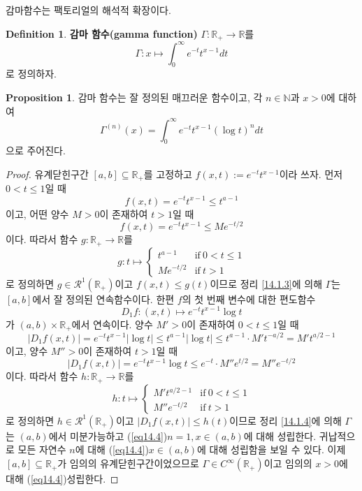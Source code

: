 \documentclass[11pt]{book}
\numberwithin{equation}{chapter}
\def\NN{\mathbb{N}}
\def\RR{\mathbb{R}}
\def\calR{\mathcal{R}}
\newcommand{\abs}[1]{\left\vert#1\right\vert}
\def\textif{\text{if}}
\theoremstyle{definition}
\newtheorem{prop}[thm]{Proposition}
\newtheorem{defn}[thm]{Definition}
\begin{document}
감마함수는 팩토리얼의 해석적 확장이다.

\begin{defn}
    \textbf{감마 함수(gamma function)} \(\Gamma : \RR_{+} \to \RR\)를
    \[
    \Gamma : x \mapsto \int_0^{\infty} e^{-t} t^{x-1} dt
    \]
    로 정의하자.
\end{defn}

\begin{prop}
    감마 함수는 잘 정의된 매끄러운 함수이고, 각 \(n \in \NN\)과 \(x > 0\)에 대하여
    \begin{equation} \label{eq14.4}
        \Gamma^{(n)}(x) = \int_0^\infty e^{-t}t^{x-1}(\log t)^n dt
    \end{equation}
    으로 주어진다.
\end{prop}
\begin{proof}
    유계닫힌구간 \([a, b] \subseteq \RR_+\)를 고정하고 \(f(x, t) := e^{-t}t^{x-1}\)이라 쓰자. 먼저 \(0 < t \le 1\)일 때
    \[
        f(x, t) = e^{-t}t^{x-1} \le t^{a-1}
    \]
    이고, 어떤 양수 \(M > 0\)이 존재하여 \(t > 1\)일 때
    \[
        f(x, t) = e^{-t}t^{x-1} \le M e^{-t/2}
    \]
    이다. 따라서 함수 \(g : \RR_+ \to \RR\)를
    \[
    g : t \mapsto
    \begin{cases}
        t^{a-1} &\textif \ 0 < t \le 1\\
        Me^{-t/2} &\textif \ t > 1
    \end{cases}   
    \]
    로 정의하면 \(g \in \calR^1(\RR_+)\)이고 \(f(x, t) \le g(t)\)이므로 정리 \ref{14.1.3}에 의해 \(\Gamma\)는 \([a, b]\)에서 잘 정의된 연속함수이다. 한편 \(f\)의 첫 번째 변수에 대한 편도함수
    \[
    D_1f : (x, t) \mapsto e^{-t}t^{x-1} \log t    
    \]
    가 \((a, b) \times \RR_+\)에서 연속이다. 양수 \(M' > 0\)이 존재하여 \(0 < t \le 1\)일 때
    \[
        \abs{D_1f(x, t)} = e^{-t} t^{x-1} \abs{\log t} \le t^{a-1} \abs{\log t} \le t^{a-1} \cdot M' t^{-a/2} = M't^{a/2-1}
    \]
    이고, 양수 \(M'' > 0\)이 존재하여 \(t > 1\)일 때
    \[
        \abs{D_1f(x, t)} = e^{-t} t^{x-1} \log t \le e^{-t} \cdot M''e^{t/2} = M''e^{-t/2}
    \]
    이다. 따라서 함수 \(h : \RR_+ \to \RR\)를
    \[
    h : t \mapsto
    \begin{cases}
        M't^{a/2-1} &\textif \ 0 < t \le 1\\
        M''e^{-t/2} &\textif \ t > 1
    \end{cases}   
    \]
    로 정의하면 \(h \in \calR^1(\RR_+)\)이고 \(\abs{D_1f(x, t)} \le h(t)\)이므로 정리 \ref{14.1.4}에 의해 \(\Gamma\)는 \((a, b)\)에서 미분가능하고 (\ref{eq14.4})\가 \(n = 1, x \in (a, b)\)에 대해 성립한다. 귀납적으로 모든 자연수 \(n\)에 대해 (\ref{eq14.4})\가 \(x \in (a, b)\)에 대해 성립함을 보일 수 있다. 이제 \([a, b] \subseteq \RR_+\)가 임의의 유계닫힌구간이었으므로 \(\Gamma \in C^\infty(\RR_+)\)이고 임의의 \(x > 0\)에 대해 (\ref{eq14.4})\가 성립한다.
\end{proof}
\end{document}
